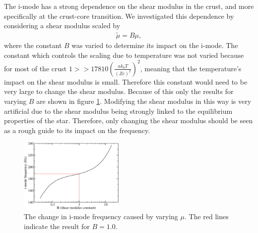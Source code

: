 \documentclass[fleqn,usenatbib]{mnras}
\begin{document}
\hspace{\parindent}The i-mode has a strong dependence on the shear modulus in the crust, and more specifically at the crust-core transition. We investigated this dependence by considering a shear modulus scaled by 
\begin{align}
\tilde{\mu} = B \mu,
\end{align}
\noindent where the constant $B$ was varied to determine its impact on the i-mode. The constant which controls the scaling due to temperature was not varied because for most of the crust $1>>17810\left(\frac{ak_bT}{\left(Ze\right)^2}\right)^2$, meaning that the temperature's impact on the shear modulus is small. Therefore this constant would need to be very large to change the shear modulus. Because of this only the results for varying $B$ are shown in figure \ref{fig:mu_B}. Modifying the shear modulus in this way is very artificial due to the shear modulus being strongly linked to the equilibrium properties of the star. Therefore, only changing the shear modulus should be seen as a rough guide to its impact on the frequency.

\begin{figure}
\centering
\includegraphics[width=0.45\textwidth,angle=0]{shear_mod_vs_freq_2}
\caption{The change in i-mode frequency caused by varying $\mu$. The red lines indicate the result for $B=1.0$.}
\label{fig:mu_B}
\end{figure}
\end{document}
